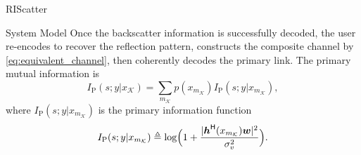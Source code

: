 \begin{section}{RIScatter}
\begin{subsection}{System Model}
		Once the backscatter information is successfully decoded, the user re-encodes to recover the reflection pattern, constructs the composite channel by \eqref{eq:equivalent_channel}, then coherently decodes the primary link.
		The primary mutual information is
		\begin{equation}
			I_{\text{P}}(s;y|x_{\mathcal{K}}) = \sum_{m_{\mathcal{K}}} p(x_{m_{\mathcal{K}}}) I_{\text{P}}(s;y|x_{m_{\mathcal{K}}}),
			\label{eq:primary_mutual_information}
		\end{equation}
		where $I_{\text{P}}(s;y|x_{m_{\mathcal{K}}})$ is the primary information function
		\begin{equation}
			I_{\text{P}}(s;y|x_{m_{\mathcal{K}}}) \triangleq \log \Bigl(1 + \frac{\lvert \boldsymbol{h}^\mathsf{H}(x_{m_{\mathcal{K}}}) \boldsymbol{w} \rvert^2}{\sigma_v^2}\Bigr).
			\label{eq:primary_information_function}
		\end{equation}
	\end{subsection}
\end{section}

